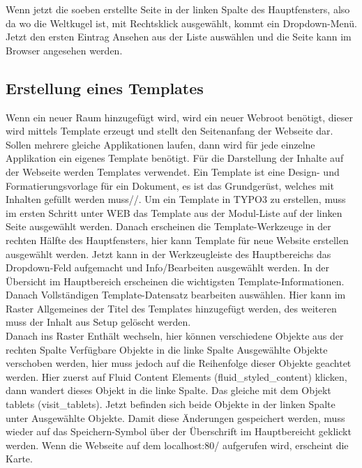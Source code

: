 Wenn jetzt die soeben erstellte Seite in der linken Spalte des Hauptfensters, also da wo die Weltkugel ist, mit Rechtsklick ausgewählt, kommt ein Dropdown-Menü. Jetzt den ersten Eintrag \glqq Ansehen\grqq{} aus der Liste auswählen und die Seite kann im Browser angesehen werden.

\subsection{Erstellung eines Templates}

Wenn ein neuer Raum hinzugefügt wird, wird ein neuer Webroot benötigt, dieser wird mittels Template erzeugt und stellt den Seitenanfang der Webseite dar. Sollen mehrere gleiche Applikationen laufen, dann wird für jede einzelne Applikation ein eigenes Template benötigt.
Für die Darstellung der Inhalte auf der Webseite werden Templates verwendet. Ein Template ist eine Design- und Formatierungsvorlage für ein Dokument, es ist das Grundgerüst, welches mit Inhalten gefüllt werden muss//.
Um ein Template in TYPO3 zu erstellen, muss im ersten Schritt unter WEB das \glqq Template\grqq{} aus der Modul-Liste auf der linken Seite ausgewählt werden. Danach erscheinen die Template-Werkzeuge in der rechten Hälfte des Hauptfensters, hier kann \glqq Template für neue Website erstellen\grqq{} ausgewählt werden. Jetzt kann in der Werkzeugleiste des Hauptbereichs das Dropdown-Feld aufgemacht und \glqq Info/Bearbeiten\grqq{} ausgewählt werden. In der Übersicht im Hauptbereich erscheinen die wichtigsten Template-Informationen. Danach \glqq Vollständigen Template-Datensatz bearbeiten\grqq{} auswählen. Hier kann im Raster \glqq Allgemeines\grqq{} der Titel des Templates hinzugefügt werden, des weiteren muss der Inhalt aus \glqq Setup\grqq{} gelöscht werden.\\
Danach ins Raster \glqq Enthält\grqq{} wechseln, hier können verschiedene Objekte aus der rechten Spalte \glqq Verfügbare Objekte\grqq{} in die linke Spalte \glqq Ausgewählte Objekte\grqq{} verschoben werden, hier muss jedoch auf die Reihenfolge dieser Objekte geachtet werden. Hier zuerst auf \glqq Fluid Content Elements (fluid\_styled\_content)\grqq{} klicken, dann wandert dieses Objekt in die linke Spalte. Das gleiche mit dem Objekt \glqq tablets (visit\_tablets)\grqq{}. Jetzt befinden sich beide Objekte in der linken Spalte unter \glqq Ausgewählte Objekte\grqq{}. Damit diese Änderungen gespeichert werden, muss wieder auf das Speichern-Symbol über der Überschrift im Hauptbereicht geklickt werden. Wenn die Webseite auf dem localhost:80/ aufgerufen wird, erscheint die Karte.



